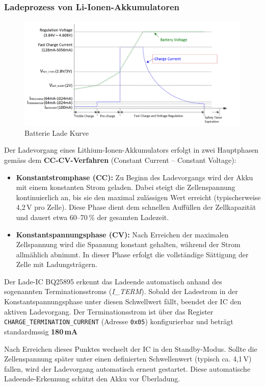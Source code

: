 \subsubsection{Ladeprozess von Li-Ionen-Akkumulatoren}

\begin{figure}[H]
    \centering
    \includegraphics[width=0.7\linewidth]{batteryChargeCurve.png}
    \caption{Batterie Lade Kurve}
    \label{fig:battery-curve}
\end{figure}

Der Ladevorgang eines Lithium-Ionen-Akkumulators erfolgt in zwei Hauptphasen gemäss dem \textbf{CC-CV-Verfahren} (Constant Current – Constant Voltage):

\begin{itemize}
    \item \textbf{Konstantstromphase (CC):}  
    Zu Beginn des Ladevorgangs wird der Akku mit einem konstanten Strom geladen. Dabei steigt die Zellenspannung kontinuierlich an, bis sie den maximal zulässigen Wert erreicht (typischerweise 4{,}2\,V pro Zelle). Diese Phase dient dem schnellen Auffüllen der Zellkapazität und dauert etwa 60--70\,\% der gesamten Ladezeit.

    \item \textbf{Konstantspannungsphase (CV):}  
    Nach Erreichen der maximalen Zellspannung wird die Spannung konstant gehalten, während der Strom allmählich abnimmt. In dieser Phase erfolgt die vollständige Sättigung der Zelle mit Ladungsträgern.
\end{itemize}

Der Lade-IC BQ25895 erkennt das Ladeende automatisch anhand des sogenannten Terminationsstroms (\textit{I\_TERM}). Sobald der Ladestrom in der Konstantspannungsphase unter diesen Schwellwert fällt, beendet der IC den aktiven Ladevorgang. Der Terminationsstrom ist über das Register \texttt{CHARGE\_TERMINATION\_CURRENT} (Adresse \texttt{0x05}) konfigurierbar und beträgt standardmssig \textbf{180\,mA} 

Nach Erreichen dieses Punktes wechselt der IC in den Standby-Modus. Sollte die Zellenspannung später unter einen definierten Schwellenwert (typisch ca. 4{,}1\,V) fallen, wird der Ladevorgang automatisch erneut gestartet. Diese automatische Ladeende-Erkennung schützt den Akku vor Überladung.

